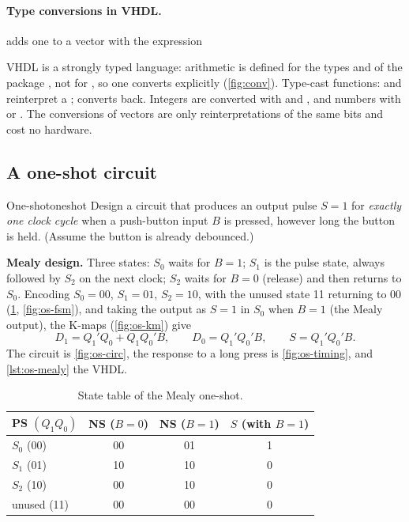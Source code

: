 \paragraph{Type conversions in VHDL.}  adds one to a vector with the expression
\begin{center}\end{center} VHDL is a strongly typed language: arithmetic is defined for the types  and  of the package , not for , so one converts explicitly (\cref{fig:conv}). Type-cast functions:  and  reinterpret a ;  converts back. Integers are converted with  and , and numbers with  or . The conversions of vectors are only reinterpretations of the same bits and cost no hardware.


\subsection{A one-shot circuit}\label{sec:oneshot}
\begin{example}{One-shot}{oneshot}
Design a circuit that produces an output pulse $S=1$ for \emph{exactly one clock cycle} when a push-button input $B$ is pressed, however long the button is held. (Assume the button is already debounced.)

\textbf{Mealy design.} Three states: $S_0$ waits for $B=1$; $S_1$ is the pulse state, always followed by $S_2$ on the next clock; $S_2$ waits for $B=0$ (release) and then returns to $S_0$. Encoding $S_0=00$, $S_1=01$, $S_2=10$, with the unused state 11 returning to 00 (\cref{tab:oneshot}, \cref{fig:os-fsm}), and taking the output as $S=1$ in $S_0$ when $B=1$ (the Mealy output), the K-maps (\cref{fig:os-km}) give
\[
 D_1 = Q_1'Q_0 + Q_1Q_0'B,\qquad D_0 = Q_1'Q_0'B,\qquad S = Q_1'Q_0'B .
\]
The circuit is \cref{fig:os-circ}, the response to a long press is \cref{fig:os-timing}, and \cref{lst:os-mealy} the VHDL.
\end{example}

\begin{table}[htbp]
\centering
\caption{State table of the Mealy one-shot.}
\label{tab:oneshot}
\begin{tabular}{l|c|c|c}
\toprule PS $(Q_1Q_0)$ & NS ($B=0$) & NS ($B=1$) & $S$ (with $B=1$)\\ \midrule
$S_0$ (00)&00&01&1\\ $S_1$ (01)&10&10&0\\ $S_2$ (10)&00&10&0\\ unused (11)&00&00&0\\ \bottomrule
\end{tabular}
\end{table}

